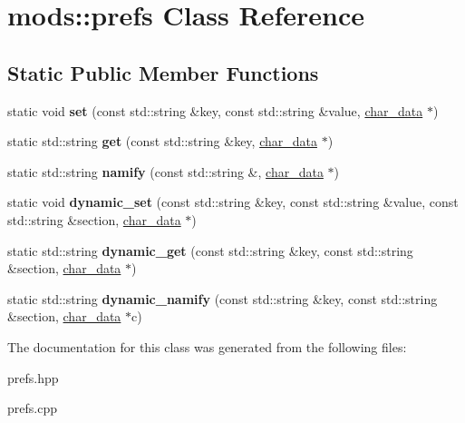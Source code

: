\hypertarget{classmods_1_1prefs}{}\section{mods\+:\+:prefs Class Reference}
\label{classmods_1_1prefs}
\subsection*{Static Public Member Functions}
\begin{DoxyCompactItemize}
\item 
\mbox{\label{classmods_1_1prefs_a0010a66bd1e46562c7cf8abf51dfc675}} 
static void {\bfseries set} (const std\+::string \&key, const std\+::string \&value, \hyperlink{structchar__data}{char\+\_\+data} $\ast$)
\item 
\mbox{\label{classmods_1_1prefs_a6d79eec75b492f6e64c8e18768dbfb70}} 
static std\+::string {\bfseries get} (const std\+::string \&key, \hyperlink{structchar__data}{char\+\_\+data} $\ast$)
\item 
\mbox{\label{classmods_1_1prefs_aa71d746acaf5d4f32281cd8f15f1d7ef}} 
static std\+::string {\bfseries namify} (const std\+::string \&, \hyperlink{structchar__data}{char\+\_\+data} $\ast$)
\item 
\mbox{\label{classmods_1_1prefs_a4b9f33a0200f091e2aa7da4388b3e8be}} 
static void {\bfseries dynamic\+\_\+set} (const std\+::string \&key, const std\+::string \&value, const std\+::string \&section, \hyperlink{structchar__data}{char\+\_\+data} $\ast$)
\item 
\mbox{\label{classmods_1_1prefs_a31a9701534d818fdefae08539967458a}} 
static std\+::string {\bfseries dynamic\+\_\+get} (const std\+::string \&key, const std\+::string \&section, \hyperlink{structchar__data}{char\+\_\+data} $\ast$)
\item 
\mbox{\label{classmods_1_1prefs_a2c7d9d0abdafb9e9f335da0e583630a3}} 
static std\+::string {\bfseries dynamic\+\_\+namify} (const std\+::string \&key, const std\+::string \&section, \hyperlink{structchar__data}{char\+\_\+data} $\ast$c)
\end{DoxyCompactItemize}


The documentation for this class was generated from the following files\+:\begin{DoxyCompactItemize}
\item 
prefs.\+hpp\item 
prefs.\+cpp\end{DoxyCompactItemize}
